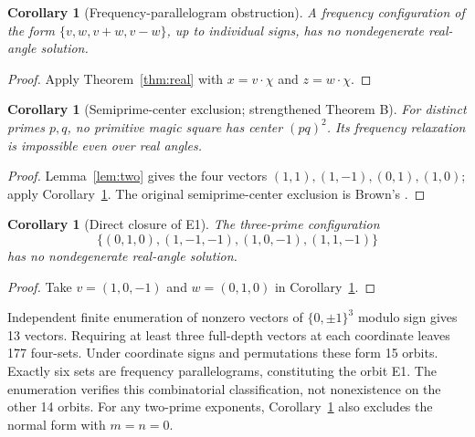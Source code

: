 \documentclass[11pt]{article}
\newtheorem{corollary}[theorem]{Corollary}
\theoremstyle{definition}\newtheorem{definition}[theorem]{Definition}
\theoremstyle{remark}\newtheorem{remark}[theorem]{Remark}
\begin{document}
\begin{corollary}[Frequency-parallelogram obstruction]\label{cor:para}
A frequency configuration of the form $\{v,w,v+w,v-w\}$, up to individual signs, has no nondegenerate real-angle solution.
\end{corollary}
\begin{proof}
Apply Theorem~\ref{thm:real} with $x=v\cdot\chi$ and $z=w\cdot\chi$.
\end{proof}

\begin{corollary}[Semiprime-center exclusion; strengthened Theorem B]\label{cor:B}
For distinct primes $p,q$, no primitive magic square has center $(pq)^2$. Its frequency relaxation is impossible even over real angles.
\end{corollary}
\begin{proof}
Lemma~\ref{lem:two} gives the four vectors $(1,1),(1,-1),(0,1),(1,0)$; apply Corollary~\ref{cor:para}. The original semiprime-center exclusion is Brown's \cite{Brown417}.
\end{proof}

\begin{corollary}[Direct closure of E1]\label{cor:E1}
The three-prime configuration
\[
\{(0,1,0),(1,-1,-1),(1,0,-1),(1,1,-1)\}
\]
has no nondegenerate real-angle solution.
\end{corollary}
\begin{proof}
Take $v=(1,0,-1)$ and $w=(0,1,0)$ in Corollary~\ref{cor:para}.
\end{proof}
Independent finite enumeration of nonzero vectors of $\{0,\pm1\}^3$ modulo sign gives 13 vectors. Requiring at least three full-depth vectors at each coordinate leaves 177 four-sets. Under coordinate signs and permutations these form 15 orbits. Exactly six sets are frequency parallelograms, constituting the orbit E1. The enumeration verifies this combinatorial classification, not nonexistence on the other 14 orbits. For any two-prime exponents, Corollary~\ref{cor:para} also excludes the normal form with $m=n=0$.
\end{document}
